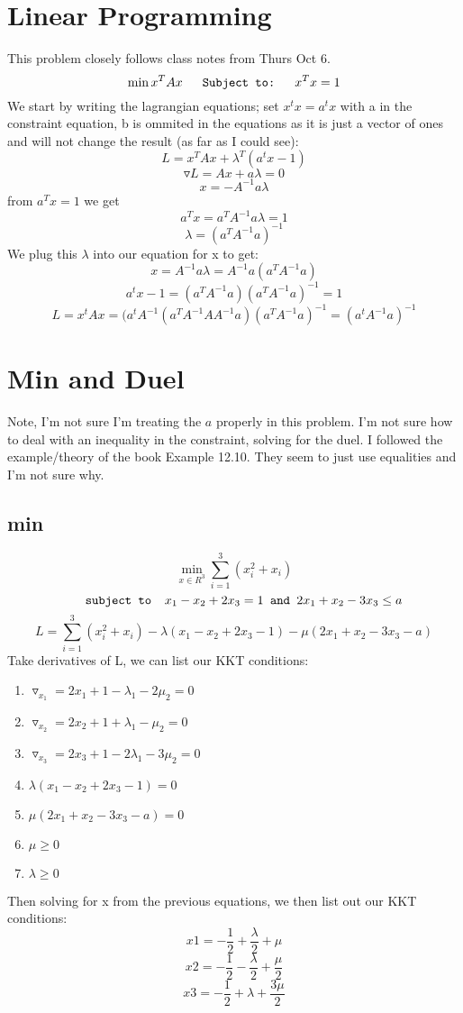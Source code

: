 \documentclass[7pt]{article}
\begin{document}
	\section{Linear Programming}
	This problem closely follows class notes from Thurs Oct 6.
	$$ \min x^TAx \verb|   Subject to:   | x^Tx =1 $$
	We start by writing the lagrangian equations; set $x^tx = a^tx$ with a in the constraint equation, b is ommited in the equations as it is just a vector of ones and will not change the result (as far as I could see): 
	$$ L = x^TAx+\lambda^T(a^tx -1) $$
	$$ \triangledown L = Ax + a\lambda = 0$$ 
	$$ x =-A^{-1}a\lambda $$ 
	from $a^Tx = 1$ we get 
	$$a^Tx = a^TA^{-1}a\lambda = 1 $$
	$$ \lambda = (a^TA^{-1}a)^{-1}$$
	We plug this $\lambda$ into our equation for x to get:
	$$x = A^{-1}a\lambda = A^{-1}a(a^TA^{-1}a) $$ 
	$$a^tx -1 = (a^TA^{-1}a)(a^TA^{-1}a)^{-1} = 1 $$
	$$ L = x^tAx = (a^tA^{-1}(a^TA^{-1}AA^{-1}a)(a^TA^{-1}a)^{-1} = (a^tA^{-1}a)^{-1}$$
	
	\section{Min and Duel}
	Note, I'm not sure I'm treating the $a$ properly in this problem. I'm not sure how to deal with an inequality in the constraint, solving for the duel. I followed the example/theory of the book Example 12.10. They seem to just use equalities and I'm not sure why. 
	\subsection{min} 
		$$\min_{x\in R^3} \sum_{i=1}^3 (x_i^2+x_i)$$
		$$ \verb|   subject to  | x_1-x_2+2x_3=1 \verb| and | 2x_1+x_2-3x_3\le a$$
		\[ L = \sum_{i=1}^3 (x_i^2+x_i) -\lambda(x_1 -x_2+2x_3-1) - \mu(2x_1+x_2-3x_3-a) \]
		Take derivatives of L, we can list our KKT conditions: 
		\begin{enumerate}
		\item$\triangledown_{x_1} = 2x_1 +1-\lambda_1 -2\mu_2 = 0$ 
		\item$\triangledown_{x_2} = 2x_2 +1 +\lambda_1 -\mu_2 = 0 $
		\item$\triangledown_{x_3} = 2x_3 +1 -2\lambda_1-3\mu_2 = 0 $
			\item $\lambda(x_1-x_2+2x_3-1) = 0 $
			\item $\mu(2x_1+x_2-3x_3-a) = 0$
			\item $\mu \ge 0 $
			\item $\lambda \ge 0$
		\end{enumerate}
		Then solving for x from the previous equations, we then list out our KKT conditions: 
		$$ x1 =-\frac{1}{2} +\frac{\lambda}{2}+\mu $$
		$$ x2 =-\frac{1}{2} -\frac{\lambda}{2}+\frac{\mu}{2} $$
		$$ x3 =-\frac{1}{2} +\lambda+\frac{3\mu}{2} $$
		
\end{document}
